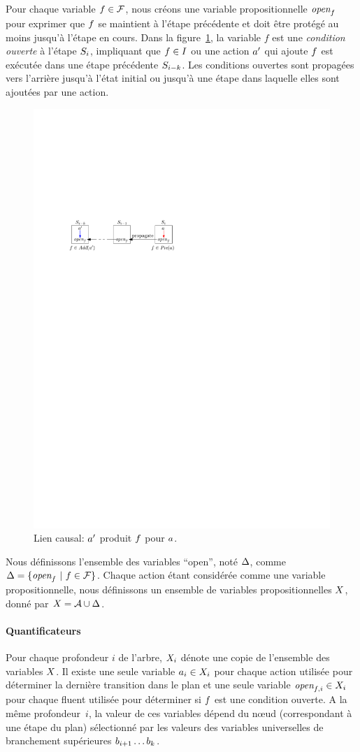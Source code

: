 Pour chaque variable $\f\in\F$, nous créons une variable propositionnelle $\openSingle{\f}$ pour exprimer que $\f$ se maintient à l'étape précédente et doit être protégé au moins jusqu'à l'étape en cours.
Dans la figure~\ref{fig:causal-link-cte}, la variable $f$ est une \textit {condition ouverte} à l'étape $\S_i$, impliquant que $\f\in\I$ ou une action $\b$ qui ajoute $\f$
est exécutée dans une étape précédente $\S_{i-k}$.
Les conditions ouvertes sont propagées vers l'arrière jusqu'à l'état initial ou jusqu'à une étape dans laquelle elles sont ajoutées par une action.


\begin{figure}[hb!]\centering
	\includegraphics[width=.4\textwidth]{figures/transitions}
    \caption{Lien causal: $\b$ produit $\f$ pour $\a$.}
    \label{fig:causal-link-cte}
\end{figure}

Nous définissons l'ensemble des variables \enquote{open}, noté $\openSet$, comme $\openSet = \{\openSingle{\f} ~|~ \f \in \F \}$. Chaque action étant considérée comme une variable propositionnelle, nous définissons un ensemble de variables propositionnelles $\X$, donné par $\X = \A \cup \openSet$.


\paragraph*{Quantificateurs}

Pour chaque profondeur $i$ de l'arbre, $\X_i$ dénote une copie de l'ensemble des variables $\X$. Il existe une seule variable $\a_{i}\in X_{i}$ pour chaque action utilisée pour déterminer la dernière transition dans le plan et une seule variable $\open{\f}{i}\in X_{i}$ pour chaque fluent utilisée pour déterminer si $\f$ est une condition ouverte. A la même profondeur~$i$, la valeur de ces variables dépend du n\oe ud (correspondant à une étape du plan) sélectionné par les valeurs des variables universelles de branchement supérieures $b_{i+1}\ldots b_{\depth}$.

